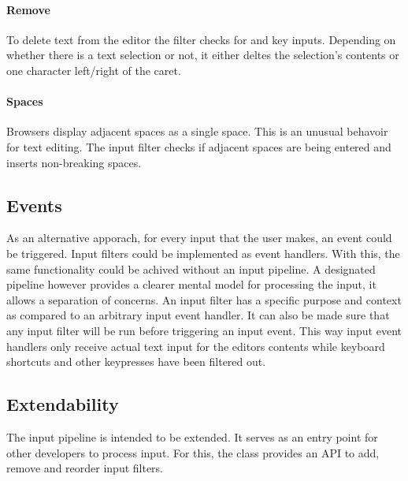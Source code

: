 \paragraph{Remove} To delete text from the editor the  filter checks for  and  key inputs. Depending on whether there is a text selection or not, it either deltes the selection's contents or one character left/right of the caret.

\paragraph{Spaces} Browsers display adjacent spaces as a single space. This is an unusual behavoir for text editing. The  input filter checks if adjacent spaces are being entered and inserts non-breaking spaces.

\subsection{Events} As an alternative apporach, for every input that the user makes, an event could be triggered. Input filters could be implemented as event handlers. With this, the same functionality could be achived without an input pipeline. A designated pipeline however provides a clearer mental model for processing the input, it allows a separation of concerns. An input filter has a specific purpose and context as compared to an arbitrary input event handler. It can also be made sure that any input filter will be run before triggering an input event. This way input event handlers only receive actual text input for the editors contents while keyboard shortcuts and other keypresses have been filtered out.

\subsection{Extendability} The input pipeline is intended to be extended. It serves as an entry point for other developers to process input. For this, the  class provides an API to add, remove and reorder input filters.








